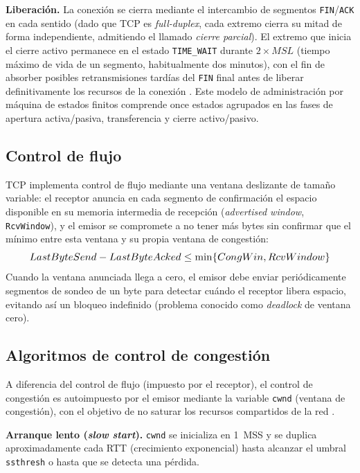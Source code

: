 \documentclass[conference]{IEEEtran}
\begin{document}
\textbf{Liberación.} La conexión se cierra mediante el intercambio de segmentos \texttt{FIN}/\texttt{ACK} en cada sentido (dado que TCP es \textit{full-duplex}, cada extremo cierra su mitad de forma independiente, admitiendo el llamado \textit{cierre parcial}). El extremo que inicia el cierre activo permanece en el estado \texttt{TIME\_WAIT} durante $2\times MSL$ (tiempo máximo de vida de un segmento, habitualmente dos minutos), con el fin de absorber posibles retransmisiones tardías del \texttt{FIN} final antes de liberar definitivamente los recursos de la conexión \cite{fuoc}. Este modelo de administración por máquina de estados finitos comprende once estados agrupados en las fases de apertura activa/pasiva, transferencia y cierre activo/pasivo.

\subsection{Control de flujo}

TCP implementa control de flujo mediante una ventana deslizante de tamaño variable: el receptor anuncia en cada segmento de confirmación el espacio disponible en su memoria intermedia de recepción (\textit{advertised window}, \texttt{RcvWindow}), y el emisor se compromete a no tener más bytes sin confirmar que el mínimo entre esta ventana y su propia ventana de congestión:
\begin{equation}
\resizebox{0.9\linewidth}{!}{$LastByteSend - LastByteAcked \le \min\{CongWin, RcvWindow\}$}
\end{equation}
Cuando la ventana anunciada llega a cero, el emisor debe enviar periódicamente segmentos de sondeo de un byte para detectar cuándo el receptor libera espacio, evitando así un bloqueo indefinido (problema conocido como \textit{deadlock} de ventana cero).

\subsection{Algoritmos de control de congestión}

A diferencia del control de flujo (impuesto por el receptor), el control de congestión es autoimpuesto por el emisor mediante la variable \texttt{cwnd} (ventana de congestión), con el objetivo de no saturar los recursos compartidos de la red \cite{fuoc}.

\textbf{Arranque lento (\textit{slow start}).} \texttt{cwnd} se inicializa en 1~MSS y se duplica aproximadamente cada RTT (crecimiento exponencial) hasta alcanzar el umbral \texttt{ssthresh} o hasta que se detecta una pérdida.
\end{document}
